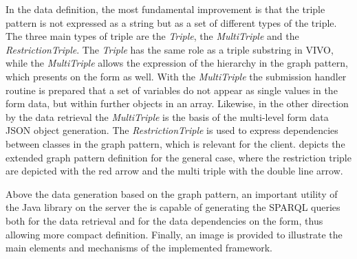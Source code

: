 In the data definition, the most fundamental improvement is that the triple pattern is not expressed as a string but as a set of different types of the triple. The three main types of triple are the \textit{Triple}, the \textit{MultiTriple} and the \textit{RestrictionTriple}. The \textit{Triple} has the same role as a triple substring in VIVO, while the \textit{MultiTriple} allows the expression of the hierarchy in the graph pattern, which presents on the form as well. With the \textit{MultiTriple} the submission handler routine is prepared that a set of variables do not appear as single values in the form data, but within further objects in an array. Likewise, in the other direction by the data retrieval the \textit{MultiTriple} is the basis of the multi-level form data JSON object generation. The \textit{RestrictionTriple} is used to express dependencies between classes in the graph pattern, which is relevant for the client.  depicts the extended graph pattern definition for the general case, where the restriction triple are depicted with the red arrow and the multi triple with the double line arrow.


Above the data generation based on the graph pattern, an important utility of the Java library on the server the is capable of generating the SPARQL queries both for the data retrieval and for the data dependencies on the form, thus allowing more compact definition. Finally, an image is provided to illustrate the main elements and mechanisms of the implemented framework.

